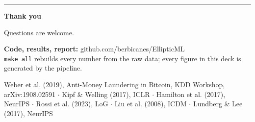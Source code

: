 \documentclass[aspectratio=169,11pt]{beamer}
\begin{document}
{
\begin{frame}
  \vspace*{0.4cm}
  {\color{accent}\rule{1cm}{2.5pt}}\par\vspace{0.3cm}
  {\rmfamily\bfseries\fontsize{34}{38}\selectfont Thank you\par}
  \vspace{0.3cm}
  {\large Questions are welcome.\par}
  \vspace{1.2cm}
  \small
  \textbf{Code, results, report:} github.com/berbicanes/EllipticML\\[0.15cm]
  {\color{muted}\texttt{make all} rebuilds every number from the raw data;
  every figure in this deck is generated by the pipeline.}\par
  \vspace{0.9cm}
  {\scriptsize\color{muted}
  Weber et al. (2019), Anti-Money Laundering in Bitcoin, KDD Workshop, arXiv:1908.02591 $\cdot$
  Kipf \& Welling (2017), ICLR $\cdot$ Hamilton et al. (2017), NeurIPS $\cdot$
  Rossi et al. (2023), LoG $\cdot$ Liu et al. (2008), ICDM $\cdot$ Lundberg \& Lee (2017), NeurIPS\par}
\end{frame}
}
\end{document}
